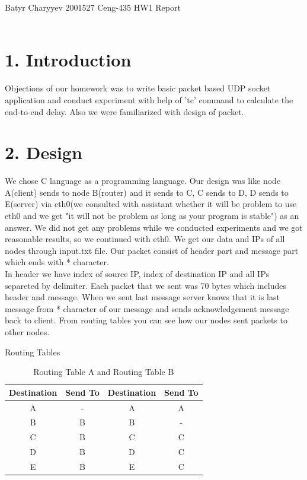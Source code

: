 \documentclass[12pt]{article}
\begin{document}
Batyr Charyyev 2001527 Ceng-435 HW1 Report \\    
\\ 
\section*{1. Introduction}
Objections of our homework was to write basic packet based UDP socket application and conduct experiment with help of 'tc' command to calculate the end-to-end delay. Also we were familiarized with design of packet. 

\section*{2. Design}
We chose C language as a programming language. Our design was like node A(client) sends to node B(router) and it sends to C, C sends to D, D sends to E(server) via eth0(we consulted with assistant whether it will be problem to use eth0 and we get "it will not be problem as long as your program is stable") as an answer. We did not get any problems while we conducted experiments and we got reasonable results, so we continued with eth0. We get our data and IPs of all nodes through input.txt file. Our packet consist of header part and message part which ends with * character. 
\\In header we have index of source IP, index of destination IP and all IPs separeted by delimiter. Each packet that we sent was 70 bytes which includes header and message. When we sent last message server knows that it is last message from * character of our message and sends acknowledgement message back to client. From routing tables you can see how our nodes sent packets to other nodes.

Routing Tables

\begin{table}[h]
\small
	\centering 
	\caption{Routing Table A and Routing Table B}
	\label{table:example}
	\begin{tabular}{|c|c|c|c|}	%
	\hline 							%
	\textbf{Destination} & \textbf{Send To  } & \textbf{Destination} & \textbf{Send To}  \\
\hline 
\hline 
A & - & A & A   \\			%
B & B & B & -    \\
C & B & C & C  \\
D & B & D & C  \\
E & B & E & C  \\

\hline 
\end{tabular}
\end{table}
\end{document}
